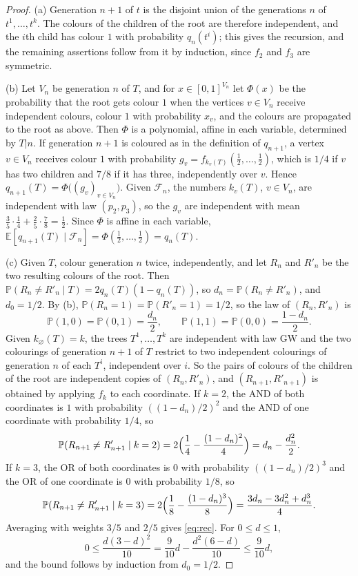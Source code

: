 \documentclass[11pt]{amsart}
\theoremstyle{remark}
\numberwithin{equation}{section}
\newcommand{\Pp}{\mathbb P}
\newcommand{\E}{\mathbb E}
\newcommand{\GW}{\mathrm{GW}}
\begin{document}
\begin{proof}
(a) Generation $n+1$ of $t$ is the disjoint union of the generations $n$ of $t^1,\dots,t^k$. The colours of the children of the root are therefore independent, and the $i$th child has colour $1$ with probability $q_n(t^i)$; this gives the recursion, and the remaining assertions follow from it by induction, since $f_2$ and $f_3$ are symmetric.

(b) Let $V_n$ be generation $n$ of $T$, and for $x\in[0,1]^{V_n}$ let $\Phi(x)$ be the probability that the root gets colour $1$ when the vertices $v\in V_n$ receive independent colours, colour $1$ with probability $x_v$, and the colours are propagated to the root as above. Then $\Phi$ is a polynomial, affine in each variable, determined by $T|n$. If generation $n+1$ is coloured as in the definition of $q_{n+1}$, a vertex $v\in V_n$ receives colour $1$ with probability $g_v=f_{k_v(T)}(\frac12,\dots,\frac12)$, which is $1/4$ if $v$ has two children and $7/8$ if it has three, independently over $v$. Hence $q_{n+1}(T)=\Phi\bigl((g_v)_{v\in V_n}\bigr)$. Given $\mathcal F_n$, the numbers $k_v(T)$, $v\in V_n$, are independent with law $(p_2,p_3)$, so the $g_v$ are independent with mean $\frac35\cdot\frac14+\frac25\cdot\frac78=\frac12$. Since $\Phi$ is affine in each variable, $\E[q_{n+1}(T)\mid\mathcal F_n]=\Phi(\frac12,\dots,\frac12)=q_n(T)$.

(c) Given $T$, colour generation $n$ twice, independently, and let $R_n$ and $R'_n$ be the two resulting colours of the root. Then $\Pp(R_n\ne R'_n\mid T)=2q_n(T)(1-q_n(T))$, so $d_n=\Pp(R_n\ne R'_n)$, and $d_0=1/2$. By (b), $\Pp(R_n=1)=\Pp(R'_n=1)=1/2$, so the law of $(R_n,R'_n)$ is
\[
\Pp(1,0)=\Pp(0,1)=\frac{d_n}2,\qquad \Pp(1,1)=\Pp(0,0)=\frac{1-d_n}2 .
\]
Given $k_\varnothing(T)=k$, the trees $T^1,\dots,T^k$ are independent with law $\GW$ and the two colourings of generation $n+1$ of $T$ restrict to two independent colourings of generation $n$ of each $T^i$, independent over $i$. So the pairs of colours of the children of the root are independent copies of $(R_n,R'_n)$, and $(R_{n+1},R'_{n+1})$ is obtained by applying $f_k$ to each coordinate. If $k=2$, the AND of both coordinates is $1$ with probability $((1-d_n)/2)^2$ and the AND of one coordinate with probability $1/4$, so
\[
\Pp(R_{n+1}\ne R'_{n+1}\mid k=2)=2\Bigl(\frac14-\frac{(1-d_n)^2}4\Bigr)=d_n-\frac{d_n^2}2 .
\]
If $k=3$, the OR of both coordinates is $0$ with probability $((1-d_n)/2)^3$ and the OR of one coordinate is $0$ with probability $1/8$, so
\[
\Pp(R_{n+1}\ne R'_{n+1}\mid k=3)=2\Bigl(\frac18-\frac{(1-d_n)^3}8\Bigr)=\frac{3d_n-3d_n^2+d_n^3}4 .
\]
Averaging with weights $3/5$ and $2/5$ gives \eqref{eq:rec}. For $0\le d\le1$,
\[
0\le\frac{d(3-d)^2}{10}=\frac9{10}d-\frac{d^2(6-d)}{10}\le\frac9{10}d ,
\]
and the bound follows by induction from $d_0=1/2$.
\end{proof}
\end{document}
